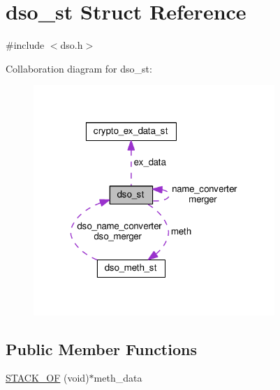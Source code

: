 \hypertarget{structdso__st}{}\section{dso\+\_\+st Struct Reference}
\label{structdso__st}


{\ttfamily \#include $<$dso.\+h$>$}



Collaboration diagram for dso\+\_\+st\+:
\nopagebreak
\begin{figure}[H]
\begin{center}
\leavevmode
\includegraphics[width=259pt]{structdso__st__coll__graph}
\end{center}
\end{figure}
\subsection*{Public Member Functions}
\begin{DoxyCompactItemize}
\item 
\hyperlink{structdso__st_acb41348359d00e800f41f1937847f2f6}{S\+T\+A\+C\+K\+\_\+\+OF} (void)$\ast$meth\+\_\+data
\end{DoxyCompactItemize}
